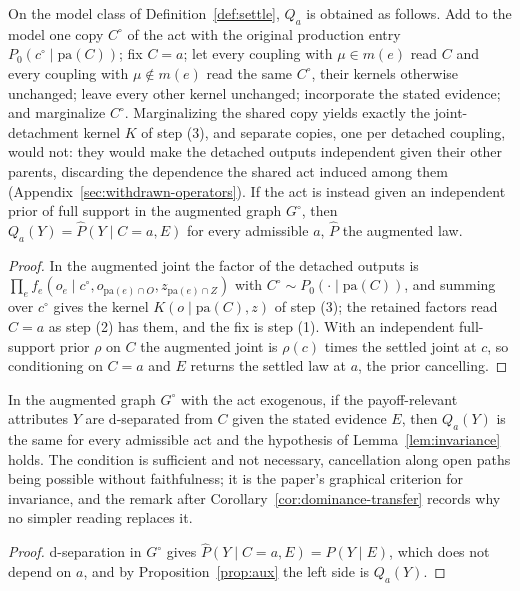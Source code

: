 \begin{proposition}\label{prop:aux}
On the model class of Definition~\ref{def:settle}, $Q_a$ is obtained as follows. Add to the model one copy $C^{\circ}$ of the act with the original production entry $P_0(c^{\circ} \mid \mathrm{pa}(C))$; fix $C = a$; let every coupling with $\mu \in m(e)$ read $C$ and every coupling with $\mu \notin m(e)$ read the same $C^{\circ}$, their kernels otherwise unchanged; leave every other kernel unchanged; incorporate the stated evidence; and marginalize $C^{\circ}$. Marginalizing the shared copy yields exactly the joint-detachment kernel $K$ of step (3), and separate copies, one per detached coupling, would not: they would make the detached outputs independent given their other parents, discarding the dependence the shared act induced among them (Appendix~\ref{sec:withdrawn-operators}). If the act is instead given an independent prior of full support in the augmented graph $G^{\circ}$, then $Q_a(Y) = \widehat P(Y \mid C = a, E)$ for every admissible $a$, $\widehat P$ the augmented law.
\end{proposition}
\begin{proof}
In the augmented joint the factor of the detached outputs is $\prod_e f_e(o_e \mid c^{\circ}, o_{\mathrm{pa}(e) \cap O}, z_{\mathrm{pa}(e) \cap Z})$ with $C^{\circ} \sim P_0(\cdot \mid \mathrm{pa}(C))$, and summing over $c^{\circ}$ gives the kernel $K(o \mid \mathrm{pa}(C), z)$ of step (3); the retained factors read $C = a$ as step (2) has them, and the fix is step (1). With an independent full-support prior $\rho$ on $C$ the augmented joint is $\rho(c)$ times the settled joint at $c$, so conditioning on $C = a$ and $E$ returns the settled law at $a$, the prior cancelling.
\end{proof}
\begin{corollary}\label{cor:dsep}
In the augmented graph $G^{\circ}$ with the act exogenous, if the payoff-relevant attributes $Y$ are d-separated from $C$ given the stated evidence $E$, then $Q_a(Y)$ is the same for every admissible act and the hypothesis of Lemma~\ref{lem:invariance} holds. The condition is sufficient and not necessary, cancellation along open paths being possible without faithfulness; it is the paper's graphical criterion for invariance, and the remark after Corollary~\ref{cor:dominance-transfer} records why no simpler reading replaces it.
\end{corollary}
\begin{proof}
d-separation in $G^{\circ}$ gives $\widehat P(Y \mid C = a, E) = \widehat P(Y \mid E)$, which does not depend on $a$, and by Proposition~\ref{prop:aux} the left side is $Q_a(Y)$.
\end{proof}

